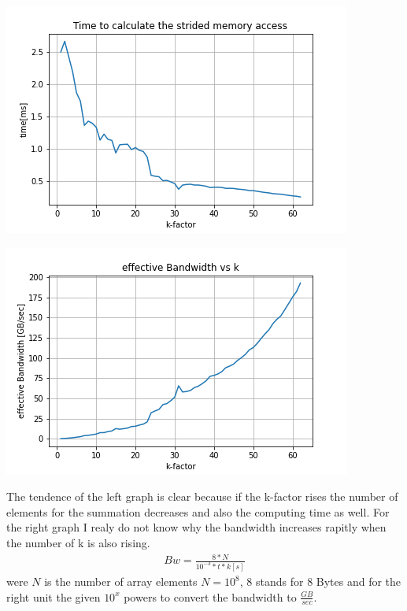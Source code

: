 \documentclass[11pt,a4paper]{article}
\begin{document}
\begin{minipage}[t]{0.49\textwidth}
	\includegraphics[width=\textwidth]{Bilder/Runtime_stride.png}
\end{minipage}
\begin{minipage}[t]{0.49\textwidth}
	\includegraphics[width=\textwidth]{Bilder/Bandwidth_stride.png}
\end{minipage}

\noindent
The tendence of the left graph is clear because if the k-factor rises the number of elements for the summation decreases and also the computing time as well. For the right graph I realy do not know why the bandwidth increases rapitly when the number of k is also rising.
\begin{align*}
Bw = \frac{8 * N}{10^{-3} * t * k [s]}
\end{align*}
were $N$ is the number of array elements $N = 10^8$, 8 stands for 8 Bytes and for the right unit the given $10^x$ powers to convert the bandwidth to $\frac{GB}{sec}$.
\newpage
\end{document}
